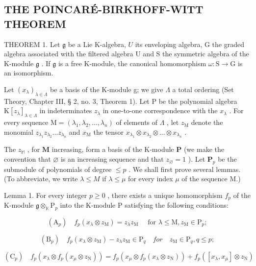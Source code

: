 \subsection{THE POINCARÉ-BIRKHOFF-WITT THEOREM}

THEOREM 1. Let \(\mathfrak{g}\) be a Lie K-algebra, \(U\) its enveloping algebra, G the graded algebra associated with the filtered algebra U and S the symmetric algebra of the K-module \(\mathfrak{g}\) . If \(\mathfrak{g}\) is a free K-module, the canonical homomorphism \(\omega: \mathrm{S} \to \mathrm{G}\) is an isomorphism.

Let \((x_{\lambda})_{\lambda \in \Lambda}\) be a basis of the K-module g; we give \(\Lambda\) a total ordering (Set Theory, Chapter III, § 2, no. 3, Theorem 1). Let P be the polynomial algebra \(\mathrm{K}[z_{\lambda}]_{\lambda \in \Lambda}\) in indeterminates \(z_{\lambda}\) in one-to-one correspondence with the \(x_{\lambda}\) . For every sequence \(\mathrm{M} = (\lambda_1, \lambda_2, \ldots, \lambda_n)\) of elements of \(\Lambda\) , let \(z_{\mathrm{M}}\) denote the monomial \(z_{\lambda_1}z_{\lambda_2}\ldots z_{\lambda_n}\) and \(x_{\mathrm{M}}\) the tensor \(x_{\lambda_1}\otimes x_{\lambda_2}\otimes \dots \otimes x_{\lambda_n}\) .

The \(z_{\mathbb{M}}\) , for \(\mathbf{M}\) increasing, form a basis of the K-module \(\mathbf{P}\) (we make the convention that \(\varnothing\) is an increasing sequence and that \(z_{\varnothing} = 1\) ). Let \(\mathbf{P}_p\) be the submodule of polynomials of degree \(\leqslant p\) . We shall first prove several lemmas. (To abbreviate, we write \(\lambda \leqslant M\) if \(\lambda \leqslant \mu\) for every index \(\mu\) of the sequence M.)

Lemma 1. For every integer \(p \geqslant 0\) , there exists a unique homomorphism \(f_p\) of the K-module \(\mathfrak{g} \otimes_{\mathbb{K}} \mathrm{P}_p\) into the K-module \(\mathrm{P}\) satisfying the following conditions:

\[
\left(\mathrm{A} _ {p}\right) \quad f _ {p} \left(x _ {\lambda} \otimes z _ {\mathrm{M}}\right) = z _ {\lambda} z _ {\mathrm{M}} \quad \text {   for   } \lambda \leqslant \mathrm{M}, z _ {\mathrm{M}} \in \mathrm{P} _ {p};
\]

\[
\left(\mathrm{B} _ {p}\right) \quad f _ {p} \left(x _ {\lambda} \otimes z _ {\mathrm{M}}\right) - z _ {\lambda} z _ {\mathrm{M}} \in \mathrm{P} _ {q} \quad for \quad z _ {\mathrm{M}} \in \mathrm{P} _ {q}, q \leqslant p;
\]

\[
\left(\mathrm{C} _ {p}\right) \quad f _ {p} \left(x _ {\lambda} \otimes f _ {p} \left(x _ {\mu} \otimes z _ {\mathrm{N}}\right)\right) = f _ {p} \left(x _ {\mu} \otimes f _ {p} \left(x _ {\lambda} \otimes z _ {\mathrm{N}}\right)\right) + f _ {p} \left(\left[ x _ {\lambda}, x _ {\mu} \right] \otimes z _ {\mathrm{N}}\right)
\]


